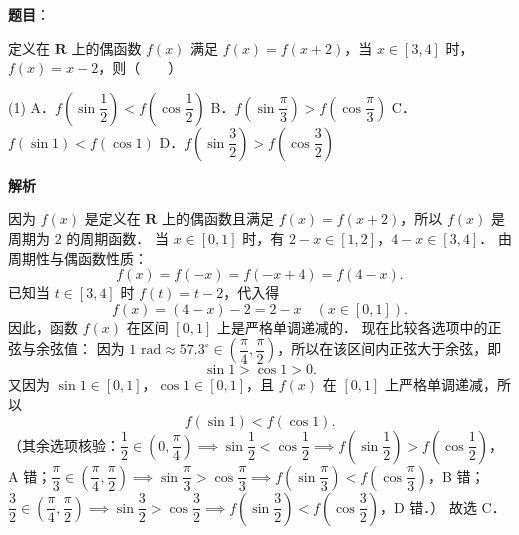 \begin{answer}

\textbf{题目}：

定义在 $\mathbf{R}$ 上的偶函数 $f(x)$ 满足 $f(x) = f(x + 2)$，当 $x \in [3, 4]$ 时，$f(x) = x - 2$，则\mbox{（　　）}

\begin{gkopts}(1)
\task A．$f\left(\sin\dfrac{1}{2}\right) < f\left(\cos\dfrac{1}{2}\right)$
\task B．$f\left(\sin\dfrac{\pi}{3}\right) > f\left(\cos\dfrac{\pi}{3}\right)$
\task C．$f(\sin 1) < f(\cos 1)$
\task D．$f\left(\sin\dfrac{3}{2}\right) > f\left(\cos\dfrac{3}{2}\right)$
\end{gkopts}

\textbf{解析}

因为 $f(x)$ 是定义在 $\mathbf{R}$ 上的偶函数且满足 $f(x) = f(x + 2)$，所以 $f(x)$ 是周期为 $2$ 的周期函数．
当 $x \in [0, 1]$ 时，有 $2 - x \in [1, 2]$，$4 - x \in [3, 4]$．
由周期性与偶函数性质：
\nopagebreak[4]
\[
f(x) = f(-x) = f(-x + 4) = f(4 - x).
\]
已知当 $t \in [3, 4]$ 时 $f(t) = t - 2$，代入得
\nopagebreak[4]
\[
f(x) = (4 - x) - 2 = 2 - x \quad (x \in [0, 1]).
\]
因此，函数 $f(x)$ 在区间 $[0, 1]$ 上是严格单调递减的．
现在比较各选项中的正弦与余弦值：
因为 $1\text{ rad} \approx 57.3^\circ \in \left(\dfrac{\pi}{4}, \dfrac{\pi}{2}\right)$，所以在该区间内正弦大于余弦，即
\nopagebreak[4]
\[
\sin 1 > \cos 1 > 0.
\]
又因为 $\sin 1 \in [0, 1]$，$\cos 1 \in [0, 1]$，且 $f(x)$ 在 $[0, 1]$ 上严格单调递减，所以
\nopagebreak[4]
\[
f(\sin 1) < f(\cos 1).
\]
（其余选项核验：$\dfrac{1}{2} \in \left(0, \dfrac{\pi}{4}\right) \implies \sin\dfrac{1}{2} < \cos\dfrac{1}{2} \implies f\left(\sin\dfrac{1}{2}\right) > f\left(\cos\dfrac{1}{2}\right)$，A 错；$\dfrac{\pi}{3} \in \left(\dfrac{\pi}{4}, \dfrac{\pi}{2}\right) \implies \sin\dfrac{\pi}{3} > \cos\dfrac{\pi}{3} \implies f\left(\sin\dfrac{\pi}{3}\right) < f\left(\cos\dfrac{\pi}{3}\right)$，B 错；$\dfrac{3}{2} \in \left(\dfrac{\pi}{4}, \dfrac{\pi}{2}\right) \implies \sin\dfrac{3}{2} > \cos\dfrac{3}{2} \implies f\left(\sin\dfrac{3}{2}\right) < f\left(\cos\dfrac{3}{2}\right)$，D 错．）
故选 C．


\end{answer}
